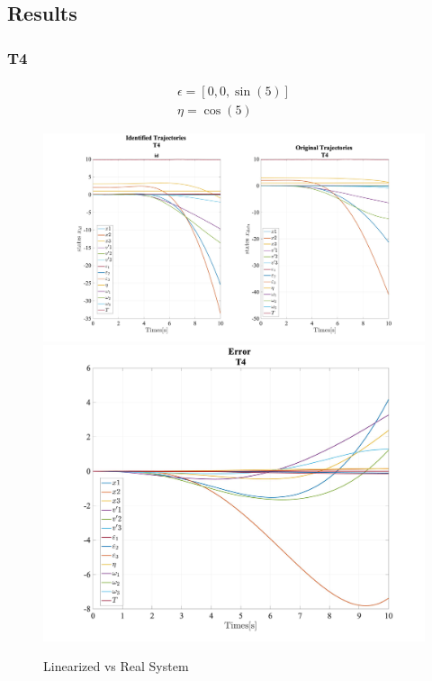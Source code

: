 \documentclass{beamer}
\begin{document}
\subsection{Results}
\begin{frame}
    \frametitle{T4}
    \begin{equation*}
        \begin{array}{c}
            \epsilon = [0, 0, \sin(5)] \\
            \eta = \cos(5)
        \end{array}
    \end{equation*}
    \begin{figure}[htp]
        \centering
        \includegraphics[height=0.30\textwidth]{T4}
        \includegraphics[height=0.30\textwidth]{T4_error}
        \caption{Linearized vs Real System}
        \label{fig:t4}
    \end{figure}
\end{frame}
\end{document}

